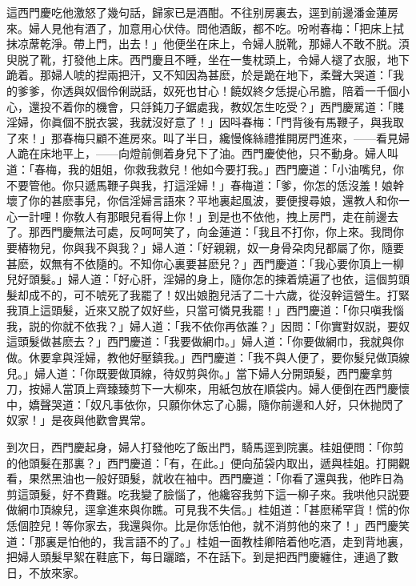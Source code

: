 這西門慶吃他激怒了幾句話，歸家已是酒酣。不往别房裏去，逕到前邊潘金蓮房來。婦人見他有酒了，加意用心伏侍。問他酒飯，都不吃。吩咐春梅：「把床上拭抹凉蓆乾淨。帶上門，出去！」他便坐在床上，令婦人脱靴，那婦人不敢不脱。湏臾脱了靴，打發他上床。西門慶且不睡，坐在一隻枕頭上，令婦人褪了衣服，地下跪着。那婦人唬的揑兩把汗，又不知因為甚麽，於是跪在地下，柔聲大哭道：「我的爹爹，你透與奴個伶俐説話，奴死也甘心！饒奴終夕恁提心吊膽，陪着一千個小心，還投不着你的機會，只㧱鈍刀子鋸處我，教奴怎生吃受？」西門慶駡道：「賤淫婦，你眞個不脱衣裳，我就沒好意了！」因呌春梅：「門背後有馬鞭子，與我取了來！」那春梅只顧不進房來。叫了半日，纔慢條絲禮推開房門進來，——看見婦人跪在床地平上，——向燈前側着身兒下了油。西門慶使他，只不動身。婦人叫道：「春梅，我的姐姐，你救我救兒！他如今要打我。」西門慶道：「小油嘴兒，你不要管他。你只遞馬鞭子與我，打這淫婦！」春梅道：「爹，你怎的恁沒羞！娘幹壞了你的甚麽事兒，你信淫婦言語來？平地裏起風波，要便搜尋娘，還教人和你一心一計哩！你敎人有那眼兒看得上你！」到是也不依他，拽上房門，走在前邊去了。那西門慶無法可處，反呵呵笑了，向金蓮道：「我且不打你，你上來。我問你要樁物兒，你與我不與我？」婦人道：「好親親，奴一身骨朶肉兒都屬了你，隨要甚麽，奴無有不依隨的。不知你心裏要甚麽兒？」西門慶道：「我心要你頂上一柳兒好頭髮。」婦人道：「好心肝，淫婦的身上，隨你怎的揀着燒遍了也依，這個剪頭髮却成不的，可不唬死了我罷了！奴出娘胞兒活了二十六歲，從沒幹這營生。打緊我頂上這頭髮，近來又脱了奴好些，只當可憐見我罷！」西門慶道：「你只嗔我惱我，説的你就不依我？」婦人道：「我不依你再依誰？」因問：「你實對奴説，要奴這頭髮做甚麽去？」西門慶道：「我要做網巾。」婦人道：「你要做網巾，我就與你做。休要拿與淫婦，教他好壓鎮我。」西門慶道：「我不與人便了，要你髮兒做頂線兒。」婦人道：「你既要做頂線，待奴剪與你。」當下婦人分開頭髮，西門慶拿剪刀，按婦人當頂上齊臻臻剪下一大柳來，用紙包放在順袋内。婦人便倒在西門慶懷中，嬌聲哭道：「奴凡事依你，只願你休忘了心腸，隨你前邊和人好，只休抛閃了奴家！」是夜與他歡會異常。

到次日，西門慶起身，婦人打發他吃了飯出門，騎馬逕到院裏。桂姐便問：「你剪的他頭髮在那裏？」西門慶道：「有，在此。」便向茄袋内取出，遞與桂姐。打開觀看，果然黑油也一般好頭髮，就收在袖中。西門慶道：「你看了還與我，他昨日為剪這頭髮，好不費難。吃我變了臉惱了，他纔容我剪下這一柳子來。我哄他只説要做網巾頂線兒，逕拿進來與你瞧。可見我不失信。」桂姐道：「甚麽稀罕貨！慌的你恁個腔兒！等你家去，我還與你。比是你恁怕他，就不消剪他的來了！」西門慶笑道：「那裏是怕他的，我言語不的了。」桂姐一面教桂卿陪着他吃酒，走到背地裏，把婦人頭髮早絮在鞋底下，每日躧踏，不在話下。到是把西門慶纏住，連過了數日，不放來家。

